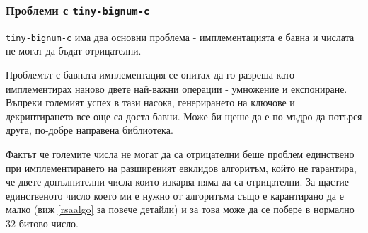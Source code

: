 \subsubsection{Проблеми с {\tt tiny-bignum-c}}
{\tt tiny-bignum-c} има два основни проблема - имплементацията е бавна и числата не могат да бъдат отрицателни.

Проблемът с бавната имплементация се опитах да го разреша като имплементирах наново двете най-важни операции - умножение и експониране. Въпреки големият успех в тази насока, генерирането на ключове и декриптирането все още са доста бавни. Може би щеше да е по-мъдро да потърся друга, по-добре направена библиотека.

Фактът че големите числа не могат да са отрицателни беше проблем единствено при имплементирането на разширеният евклидов алгоритъм, който не гарантира, че двете допълнителни числа които изкарва няма да са отрицателни. За щастие единственото число което ми е нужно от алгоритъма също е карантирано да е малко (виж \ref{rsaalgo} за повече детайли) и за това може да се побере в нормално 32 битово число.


